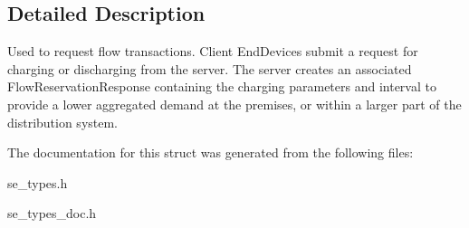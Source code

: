 \subsection{Detailed Description}
Used to request flow transactions. Client End\+Devices submit a request for charging or discharging from the server. The server creates an associated Flow\+Reservation\+Response containing the charging parameters and interval to provide a lower aggregated demand at the premises, or within a larger part of the distribution system. 

The documentation for this struct was generated from the following files\+:\begin{DoxyCompactItemize}
\item 
se\+\_\+types.\+h\item 
se\+\_\+types\+\_\+doc.\+h\end{DoxyCompactItemize}
